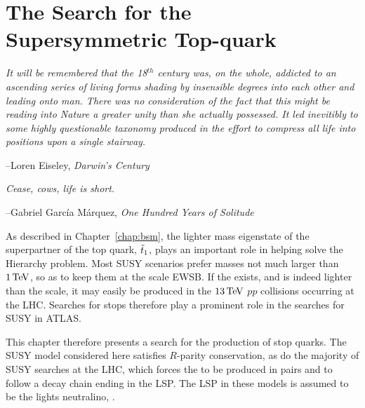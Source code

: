 \chapter{The Search for the Supersymmetric Top-quark}
\label{chap:search_stop}

\epigraph{
\textit{It will be remembered that the 18$^{th}$ century was, on the whole,
addicted to an ascending series of living forms shading by insensible degrees
into each other and leading onto man.
There was no consideration of the fact that this might be reading into Nature a greater
unity than she actually possessed. It led inevitibly to some highly
questionable taxonomy produced in the effort to compress all life into positions upon a
single stairway.}
}
{
--Loren Eiseley, \textit{Darwin's Century}
}

\epigraph{
\textit{Cease, cows, life is short.}
}
{
--Gabriel Garc\'{i}a M\'{a}rquez, \textit{One Hundred Years of Solitude}
}


As described in Chapter~\ref{chap:bsm}, the lighter mass eigenstate of the superpartner of
the top quark, $\tilde{t}_1$, plays an important role in helping solve the Hierarchy problem.
Most SUSY scenarios prefer \stopone masses not much larger than $1\,\text{Te\kern -0.1em V}$, so as to keep them
at the scale EWSB.
If the \stopone exists, and is indeed lighter than the \TeV scale, it may easily be produced in the $13\,\text{Te\kern -0.1em V}$ $pp$ collisions
occurring at the LHC.
Searches for stops therefore play a prominent role in the searches for SUSY in ATLAS.

This chapter therefore presents a search for the production of stop quarks.
The SUSY model considered here satisfies $R$-parity conservation, as do the majority of SUSY
searches at the LHC, which forces the \stopone to be produced in pairs and to follow
a decay chain ending in the LSP.
The LSP in these models is assumed to be the lights neutralino, \ninoone.

